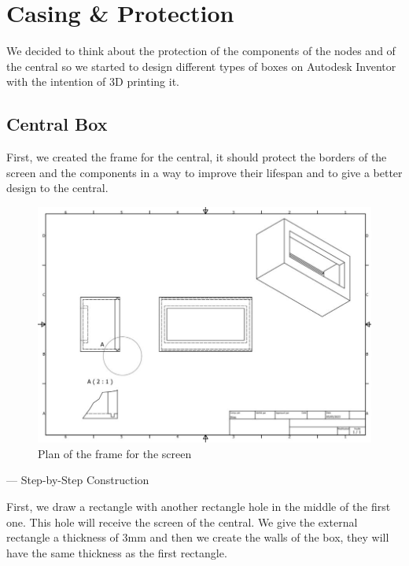 \section{Casing \& Protection}
We decided to think about the protection of the components of the nodes and of the central so we started to design different types of boxes on Autodesk Inventor with the intention of 3D printing it.

\subsection{Central Box}
First, we created the frame for the central, it should protect the borders of the screen and the components in a way to improve their lifespan and to give a better design to the central.
\begin{figure}[H]
    \centering
    \includegraphics[width=.8\textwidth]{images/casing/img16.jpg}
    \caption{Plan of the frame for the screen}
\end{figure}

--- Step-by-Step Construction

First, we draw a rectangle with another rectangle hole in the middle of the first one. This hole will receive the screen of the central. We give the external rectangle a thickness of 3mm and then we create the walls of the box, they will have the same thickness as the first rectangle.

